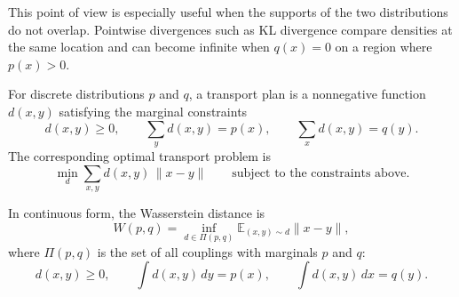 This point of view is especially useful when the supports of the two
distributions do not overlap. Pointwise divergences such as KL divergence
compare densities at the same location and can become infinite when
$q(x)=0$ on a region where $p(x)>0$. 

For discrete distributions $p$ and $q$, a transport plan is a nonnegative
function $d(x,y)$ satisfying the marginal constraints
\[
  d(x,y)\ge 0,
  \qquad
  \sum_y d(x,y)=p(x),
  \qquad
  \sum_x d(x,y)=q(y).
\]
The corresponding optimal transport problem is
\[
  \min_d \sum_{x,y} d(x,y)\,\|x-y\|
  \qquad
  \text{subject to the constraints above.}
\]

In continuous form, the Wasserstein distance is
\[
  W(p,q)
  =
  \inf_{d\in \Pi(p,q)}
  \mathbb{E}_{(x,y)\sim d}\|x-y\|,
\]
where $\Pi(p,q)$ is the set of all couplings with marginals $p$ and $q$:
\[
  d(x,y)\ge 0,
  \qquad
  \int d(x,y)\,dy = p(x),
  \qquad
  \int d(x,y)\,dx = q(y).
\]

